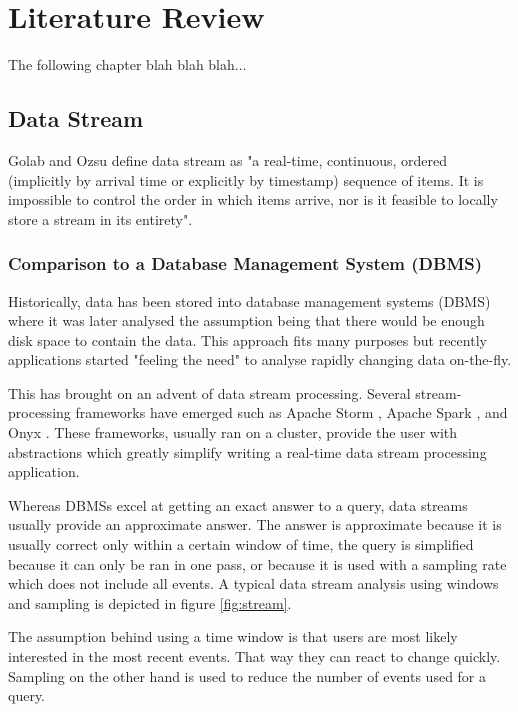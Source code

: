 \chapter{Literature Review}

The following chapter blah blah blah...

\section{Data Stream}

Golab and Ozsu define data stream as "a real-time, continuous, ordered (implicitly by arrival time or explicitly by timestamp) sequence of items. It is impossible to control the order in which items arrive, nor is it feasible to locally store a stream in its entirety". \cite{golab2003issues}

\subsection{Comparison to a Database Management System (DBMS)}

Historically, data has been stored into database management systems (DBMS) where it was later analysed the assumption being that there would be enough disk space to contain the data. This approach fits many purposes but recently applications started "feeling the need" to analyse rapidly changing data on-the-fly.

This has brought on an advent of data stream processing. Several stream-processing frameworks have emerged such as Apache Storm \cite{ApacheStorm}, Apache Spark \cite{ApacheSpark}, and Onyx \cite{Onyx}. These frameworks, usually ran on a cluster, provide the user with abstractions which greatly simplify writing a real-time data stream processing application.

Whereas DBMSs excel at getting an exact answer to a query, data streams usually provide an approximate answer. The answer is approximate because it is usually correct only within a certain window of time, the query is simplified because it can only be ran in one pass, or because it is used with a sampling rate which does not include all events. A typical data stream analysis using windows and sampling is depicted in figure \ref{fig:stream}.

The assumption behind using a time window is that users are most likely interested in the most recent events. That way they can  react to change quickly. Sampling on the other hand is used to reduce the number of events used for a query. \cite{Gaber:2005:MDS:1083784.1083789}

